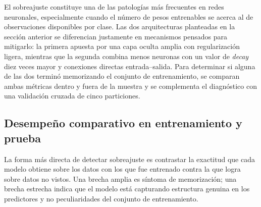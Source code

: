 \documentclass[
]{article}
\begin{document}
El sobreajuste constituye una de las patologías más frecuentes en redes
neuronales, especialmente cuando el número de pesos entrenables se
acerca al de observaciones disponibles por clase. Las dos arquitecturas
planteadas en la sección anterior se diferencian justamente en
mecanismos pensados para mitigarlo: la primera apuesta por una capa
oculta amplia con regularización ligera, mientras que la segunda combina
menos neuronas con un valor de \emph{decay} diez veces mayor y
conexiones directas entrada--salida. Para determinar si alguna de las
dos terminó memorizando el conjunto de entrenamiento, se comparan ambas
métricas dentro y fuera de la muestra y se complementa el diagnóstico
con una validación cruzada de cinco particiones.

\subsection{Desempeño comparativo en entrenamiento y
prueba}\label{desempeuxf1o-comparativo-en-entrenamiento-y-prueba}

La forma más directa de detectar sobreajuste es contrastar la exactitud
que cada modelo obtiene sobre los datos con los que fue entrenado contra
la que logra sobre datos no vistos. Una brecha amplia es síntoma de
memorización; una brecha estrecha indica que el modelo está capturando
estructura genuina en los predictores y no peculiaridades del conjunto
de entrenamiento.
\end{document}
